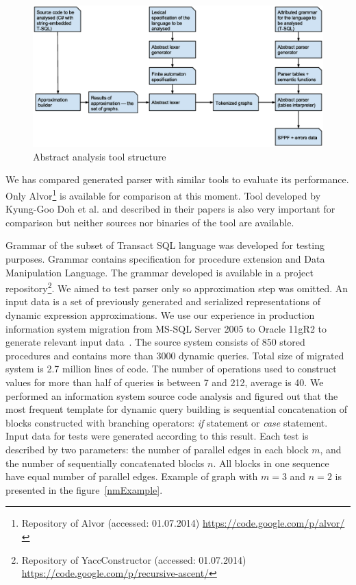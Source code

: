 \documentclass{sigplanconf}
\begin{document}
\begin{figure}%
    \begin{center}
        \includegraphics[scale=0.5]{Graphs/General_structure_of_generator.eps}
    \end{center}
    \caption{Abstract analysis tool structure}
    \label{tStruct}
\end{figure}

We has compared generated parser with similar tools to evaluate its performance. Only Alvor\footnote{Repository of Alvor (accessed: 01.07.2014) \url{https://code.google.com/p/alvor/}} is available for comparison at this moment. Tool developed by Kyung-Goo Doh et al. and described in their papers is also very important for comparison but neither sources nor binaries of the tool are available.

Grammar of the subset of Transact SQL language was developed for  testing purposes. Grammar contains specification for procedure extension and Data Manipulation Language. The grammar developed is available in a project repository\footnote{Repository of YaccConstructor (accessed: 01.07.2014) \url{https://code.google.com/p/recursive-ascent/}}. We aimed to test parser only so approximation step was omitted. An input data is a set of previously generated and serialized representations of dynamic expression approximations. We use our experience in production information system migration  from MS-SQL Server 2005 to Oracle 11gR2 to generate relevant input data~\cite{GrigorevDSQL}. The source system consists of 850 stored procedures and contains more than 3000 dynamic queries. Total size of migrated system is 2.7 million lines of code. The number of operations used to construct values for more than half of queries is between 7 and 212, average is 40. We performed an information system source code analysis and figured out that the most frequent template for dynamic query building is sequential concatenation of blocks constructed with branching operators: {\it if} statement or {\it case} statement. Input data for tests were generated according to this result. Each test is described by two parameters: the number of parallel edges in each block $m$, and the number of sequentially concatenated blocks $n$. All blocks in one sequence have equal number of parallel edges. Example of graph with $m = 3$ and $n = 2$ is presented in the figure~\ref{nmExample}.
\end{document}

